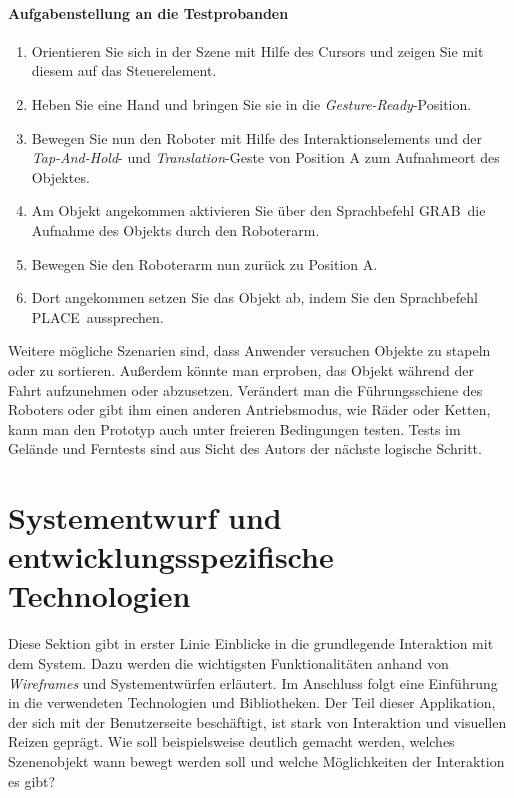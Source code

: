 \paragraph*{Aufgabenstellung an die Testprobanden}
\begin{enumerate}
	\item Orientieren Sie sich in der Szene mit Hilfe des Cursors und zeigen Sie mit diesem auf das Steuerelement.
	\item Heben Sie eine Hand und bringen Sie sie in die \textit{Gesture-Ready}-Position.
	\item Bewegen Sie nun den Roboter mit Hilfe des Interaktionselements und der \textit{Tap-And-Hold}- und \textit{Translation}-Geste von Position A zum Aufnahmeort des Objektes.
	\item Am Objekt angekommen aktivieren Sie über den Sprachbefehl \frqq GRAB\flqq\ die Aufnahme des Objekts durch den Roboterarm.
	\item Bewegen Sie den Roboterarm nun zurück zu Position A.
	\item Dort angekommen setzen Sie das Objekt ab, indem Sie den Sprachbefehl \frqq PLACE\flqq\ aussprechen.
\end{enumerate}
Weitere mögliche Szenarien sind, dass Anwender versuchen Objekte zu
stapeln oder zu sortieren. Außerdem könnte man erproben, das Objekt während der
Fahrt aufzunehmen oder abzusetzen. Verändert man die Führungsschiene des Roboters oder gibt ihm einen anderen Antriebsmodus, wie Räder oder Ketten, kann man den Prototyp auch unter freieren Bedingungen testen. Tests im Gelände und Ferntests sind aus Sicht des Autors der nächste logische Schritt.
\section{Systementwurf und entwicklungsspezifische Technologien}
Diese Sektion gibt in erster Linie Einblicke in die grundlegende Interaktion mit dem System. Dazu werden die wichtigsten Funktionalitäten anhand von \textit{Wireframes} und Systementwürfen erläutert. Im Anschluss folgt eine Einführung in die verwendeten Technologien und Bibliotheken. Der Teil dieser Applikation, der sich mit der Benutzerseite beschäftigt, ist stark von Interaktion und visuellen Reizen geprägt. Wie soll beispielsweise deutlich gemacht werden, welches Szenenobjekt wann bewegt werden soll und welche Möglichkeiten der Interaktion es gibt?
